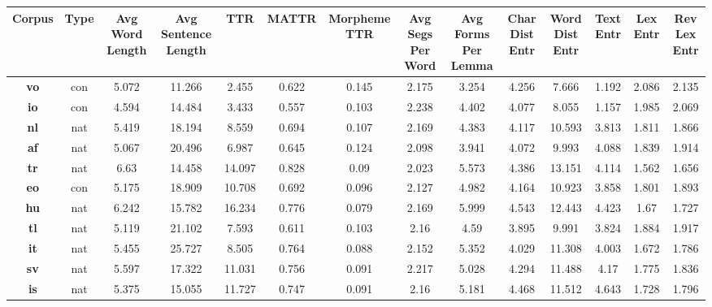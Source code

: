 \documentclass[12pt,a4paper]{article}
\numberwithin{figure}{section}
\numberwithin{table}{section}
\numberwithin{definition}{section}
\begin{document}
\begin{table}
  \centering
  \renewcommand{\arraystretch}{1.0}
      \begin{tabular}{|c|c|c|c|c|c|c|c|c|c|c|c|c|c|}
      \hline
          \textbf{Corpus} & \textbf{Type} & \textbf{Avg Word Length} & \textbf{Avg Sentence Length} & \textbf{TTR} & \textbf{MATTR} & \textbf{Morpheme TTR} & \textbf{Avg Segs Per Word} & \textbf{Avg Forms Per Lemma} & \textbf{Char Dist Entr} & \textbf{Word Dist Entr} & \textbf{Text Entr} & \textbf{Lex Entr} & \textbf{Rev Lex Entr} \\ \hline
          \textbf{vo} & con & 5.072 & 11.266 & 2.455 & 0.622 & 0.145 & 2.175 & 3.254 & 4.256 & 7.666 & 1.192 & 2.086 & 2.135 \\ \hline
          \textbf{io} & con & 4.594 & 14.484 & 3.433 & 0.557 & 0.103 & 2.238 & 4.402 & 4.077 & 8.055 & 1.157 & 1.985 & 2.069 \\ \hline
          \textbf{nl} & nat & 5.419 & 18.194 & 8.559 & 0.694 & 0.107 & 2.169 & 4.383 & 4.117 & 10.593 & 3.813 & 1.811 & 1.866 \\ \hline
          \textbf{af} & nat & 5.067 & 20.496 & 6.987 & 0.645 & 0.124 & 2.098 & 3.941 & 4.072 & 9.993 & 4.088 & 1.839 & 1.914 \\ \hline
          \textbf{tr} & nat & 6.63 & 14.458 & 14.097 & 0.828 & 0.09 & 2.023 & 5.573 & 4.386 & 13.151 & 4.114 & 1.562 & 1.656 \\ \hline
          \textbf{eo} & con & 5.175 & 18.909 & 10.708 & 0.692 & 0.096 & 2.127 & 4.982 & 4.164 & 10.923 & 3.858 & 1.801 & 1.893 \\ \hline
          \textbf{hu} & nat & 6.242 & 15.782 & 16.234 & 0.776 & 0.079 & 2.169 & 5.999 & 4.543 & 12.443 & 4.423 & 1.67 & 1.727 \\ \hline
          \textbf{tl} & nat & 5.119 & 21.102 & 7.593 & 0.611 & 0.103 & 2.16 & 4.59 & 3.895 & 9.991 & 3.824 & 1.884 & 1.917 \\ \hline
          \textbf{it} & nat & 5.455 & 25.727 & 8.505 & 0.764 & 0.088 & 2.152 & 5.352 & 4.029 & 11.308 & 4.003 & 1.672 & 1.786 \\ \hline
          \textbf{sv} & nat & 5.597 & 17.322 & 11.031 & 0.756 & 0.091 & 2.217 & 5.028 & 4.294 & 11.488 & 4.17 & 1.775 & 1.836 \\ \hline
          \textbf{is} & nat & 5.375 & 15.055 & 11.727 & 0.747 & 0.091 & 2.16 & 5.181 & 4.468 & 11.512 & 4.643 & 1.728 & 1.796 \\ \hline

\end{tabular}
\end{table}
\end{document}
